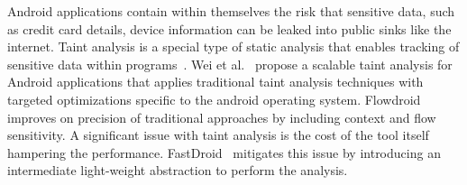 Android applications contain within themselves the risk that sensitive data, such as credit card details, device information can be leaked into public sinks like the internet. Taint analysis is a special type of static analysis that enables tracking of sensitive data within programs~\cite{boddenesec}. Wei et al.~\cite{weiissta} propose a scalable taint analysis for Android applications that applies traditional taint analysis techniques with targeted optimizations specific to the android operating system. Flowdroid~\cite{DBLP:conf/pldi/ArztRFBBKTOM14} improves on precision of traditional approaches by including context and flow sensitivity. A significant issue with taint analysis is the cost of the tool itself hampering the performance. FastDroid~\cite{ZHANG2021102161} mitigates this issue by introducing an intermediate light-weight abstraction to perform the analysis. 

